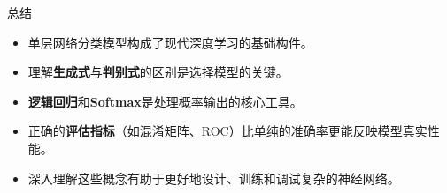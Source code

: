 \documentclass[12pt, aspectratio=169]{beamer}
\begin{document}
\begin{frame}{总结}
    \begin{itemize}
        \item 单层网络分类模型构成了现代深度学习的基础构件。
        \item 理解\textbf{生成式}与\textbf{判别式}的区别是选择模型的关键。
        \item \textbf{逻辑回归}和\textbf{Softmax}是处理概率输出的核心工具。
        \item 正确的\textbf{评估指标}（如混淆矩阵、ROC）比单纯的准确率更能反映模型真实性能。
        \item 深入理解这些概念有助于更好地设计、训练和调试复杂的神经网络。
    \end{itemize}

\end{frame}
\end{document}
